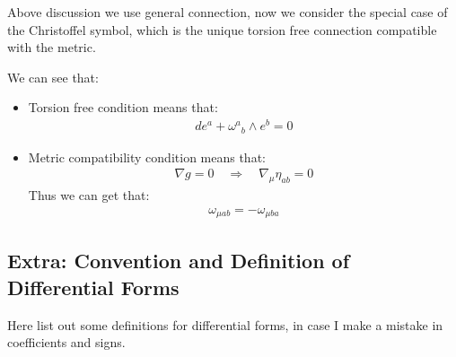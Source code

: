 Above discussion we use general connection, now we consider the
special case of the Christoffel symbol, which is the unique torsion
free connection compatible with the metric.

We can see that:
\begin{itemize}
  \item Torsion free condition means that:
    \begin{align}
      de^a + \omega^a{}_b \wedge e^b = 0
    \end{align}
  \item Metric compatibility condition means that:
    \begin{align}
      \nabla g = 0 \quad \Rightarrow \quad \nabla_\mu \eta_{ab} = 0
    \end{align}
    Thus we can get that:
    \begin{align}
      \omega_{\mu ab} = -\omega_{\mu ba}
    \end{align}
\end{itemize}

\subsection{Extra: Convention and Definition of Differential Forms}

Here list out some definitions for differential forms, in case I make
a mistake in coefficients and signs.
